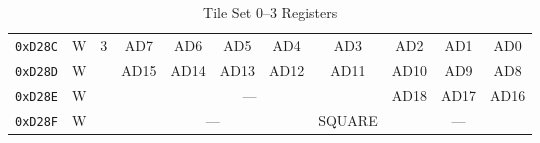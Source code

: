 \begin{table}[ht]
\begin{center}
\begin{tabular}{|c|c|c|c|c|c|c|c|c|c|c|}
            \verb+0xD28C+ & W & \multirow{4}{*}{3} & AD7 & AD6 & AD5 & AD4 & AD3 & AD2 & AD1 & AD0 \\ \cline{1-2}\cline{4-11}
            \verb+0xD28D+ & W &                    & AD15 & AD14 & AD13 & AD12 & AD11 & AD10 & AD9 & AD8 \\ \cline{1-2}\cline{4-11}
            \verb+0xD28E+ & W &                    & \multicolumn{5}{|c|}{---} & AD18 & AD17 & AD16 \\ \cline{1-2}\cline{4-11}
            \verb+0xD28F+ & W &                    & \multicolumn{4}{|c|}{---} & SQUARE & \multicolumn{3}{|c|}{---} \\ \hline\hline
        \end{tabular}
    \end{center}
    \caption{Tile Set 0--3 Registers}
    \label{tab:tile_set_addr}
\end{table}

